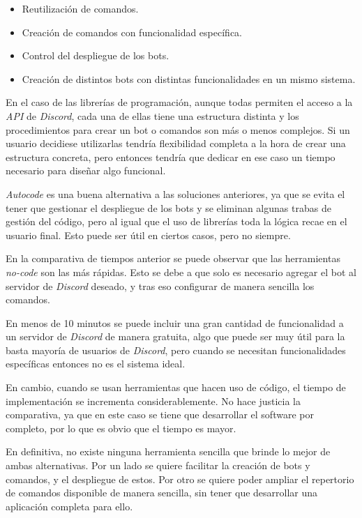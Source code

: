 \begin{itemize}
	\item Reutilización de comandos.
	\item Creación de comandos con funcionalidad específica.
	\item Control del despliegue de los bots.
	\item Creación de distintos bots con distintas funcionalidades en un mismo sistema.
\end{itemize}

En el caso de las librerías de programación, aunque todas permiten el acceso a la \textit{API} de \textit{Discord}, cada una de ellas tiene una estructura distinta y los procedimientos para crear un bot o comandos son más o menos complejos. Si un usuario decidiese utilizarlas tendría flexibilidad completa a la hora de crear una estructura concreta, pero entonces tendría que dedicar en ese caso un tiempo necesario para diseñar algo funcional.

\textit{Autocode} es una buena alternativa a las soluciones anteriores, ya que se evita el tener que gestionar el despliegue de los bots y se eliminan algunas trabas de gestión del código, pero al igual que el uso de librerías toda la lógica recae en el usuario final. Esto puede ser útil en ciertos casos, pero no siempre.

En la comparativa de tiempos anterior se puede observar que las herramientas \textit{no-code} son las más rápidas. Esto se debe a que solo es necesario agregar el bot al servidor de \textit{Discord} deseado, y tras eso configurar de manera sencilla los comandos.

En menos de 10 minutos se puede incluir una gran cantidad de funcionalidad a un servidor de \textit{Discord} de manera gratuita, algo que puede ser muy útil para la basta mayoría de usuarios de \textit{Discord}, pero cuando se necesitan funcionalidades específicas entonces no es el sistema ideal.

En cambio, cuando se usan herramientas que hacen uso de código, el tiempo de implementación se incrementa considerablemente. No hace justicia la comparativa, ya que en este caso se tiene que desarrollar el software por completo, por lo que es obvio que el tiempo es mayor.

En definitiva, no existe ninguna herramienta sencilla que brinde lo mejor de ambas alternativas. Por un lado se quiere facilitar la creación de bots y comandos, y el despliegue de estos. Por otro se quiere poder ampliar el repertorio de comandos disponible de manera sencilla, sin tener que desarrollar una aplicación completa para ello.
